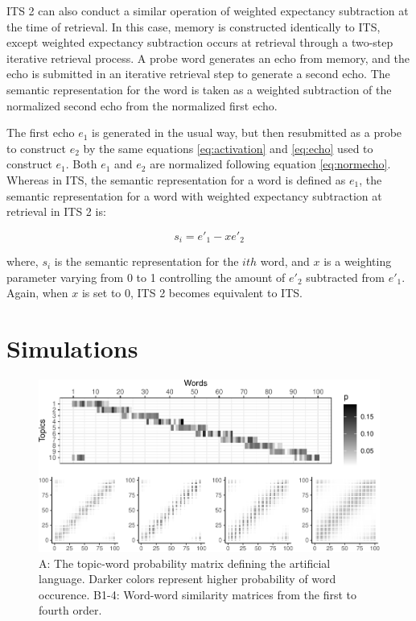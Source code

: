 \documentclass[
  jou]{apa6}
\begin{document}
ITS 2 can also conduct a similar operation of weighted expectancy subtraction at the time of retrieval. In this case, memory is constructed identically to ITS, except weighted expectancy subtraction occurs at retrieval through a two-step iterative retrieval process. A probe word generates an echo from memory, and the echo is submitted in an iterative retrieval step to generate a second echo. The semantic representation for the word is taken as a weighted subtraction of the normalized second echo from the normalized first echo.

The first echo \(e_1\) is generated in the usual way, but then resubmitted as a probe to construct \(e_2\) by the same equations \eqref{eq:activation} and \eqref{eq:echo} used to construct \(e_1\). Both \(e_1\) and \(e_2\) are normalized following equation \eqref{eq:normecho}. Whereas in ITS, the semantic representation for a word is defined as \(e_1\), the semantic representation for a word with weighted expectancy subtraction at retrieval in ITS 2 is:

\begin{equation}
s_i = e'_1 - xe'_2
\label{eq:ITS2retrieval}
\end{equation}

where, \(s_i\) is the semantic representation for the \(ith\) word, and \(x\) is a weighting parameter varying from 0 to 1 controlling the amount of \(e'_2\) subtracted from \(e'_1\). Again, when \(x\) is set to 0, ITS 2 becomes equivalent to ITS.

\hypertarget{simulations}{%
\section{Simulations}\label{simulations}}

\begin{figure}

{\centering \includegraphics[width=\textwidth]{ITS_cogsci_files/figure-latex/artlang-1} 

}

\caption{A: The topic-word probability matrix defining the artificial language. Darker colors represent higher probability of word occurence. B1-4: Word-word similarity matrices from the first to fourth order.}\label{fig:artlang}
\end{figure}
\end{document}
